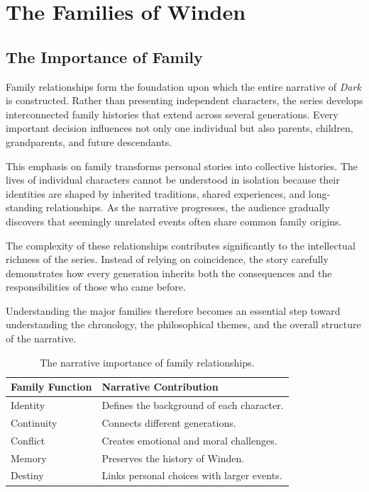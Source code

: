 \documentclass[12pt,oneside,openany]{book}
\begin{document}
\chapter{The Families of Winden}
\section{The Importance of Family}

Family relationships form the foundation upon which the entire narrative of
\textit{Dark} is constructed. Rather than presenting independent characters,
the series develops interconnected family histories that extend across several
generations. Every important decision influences not only one individual but
also parents, children, grandparents, and future descendants.

This emphasis on family transforms personal stories into collective histories.
The lives of individual characters cannot be understood in isolation because
their identities are shaped by inherited traditions, shared experiences, and
long-standing relationships. As the narrative progresses, the audience
gradually discovers that seemingly unrelated events often share common family
origins.

The complexity of these relationships contributes significantly to the
intellectual richness of the series. Instead of relying on coincidence, the
story carefully demonstrates how every generation inherits both the
consequences and the responsibilities of those who came before.

Understanding the major families therefore becomes an essential step toward
understanding the chronology, the philosophical themes, and the overall
structure of the narrative.

\begin{table}[H]
\centering
\begin{tabular}{|p{4cm}|p{8cm}|}
\hline
\textbf{Family Function} & \textbf{Narrative Contribution}\\
\hline
Identity & Defines the background of each character.\\
\hline
Continuity & Connects different generations.\\
\hline
Conflict & Creates emotional and moral challenges.\\
\hline
Memory & Preserves the history of Winden.\\
\hline
Destiny & Links personal choices with larger events.\\
\hline
\end{tabular}
\caption{The narrative importance of family relationships.}
\end{table}
\end{document}
